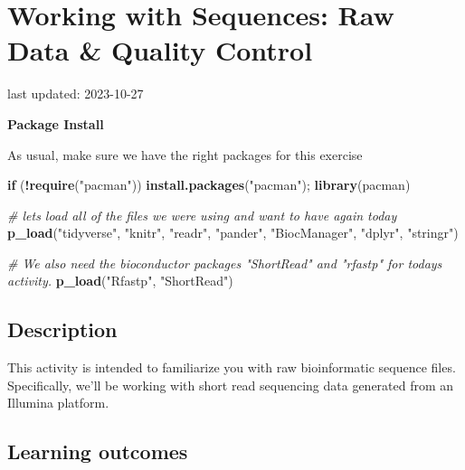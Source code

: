 \documentclass[
]{book}
\newenvironment{Shaded}{\begin{snugshade}}{\end{snugshade}}
\newcommand{\CommentTok}[1]{\textcolor[rgb]{0.56,0.35,0.01}{\textit{#1}}}
\newcommand{\ControlFlowTok}[1]{\textcolor[rgb]{0.13,0.29,0.53}{\textbf{#1}}}
\newcommand{\FunctionTok}[1]{\textcolor[rgb]{0.13,0.29,0.53}{\textbf{#1}}}
\newcommand{\NormalTok}[1]{#1}
\newcommand{\SpecialCharTok}[1]{\textcolor[rgb]{0.81,0.36,0.00}{\textbf{#1}}}
\newcommand{\StringTok}[1]{\textcolor[rgb]{0.31,0.60,0.02}{#1}}
\begin{document}
\hypertarget{working-with-sequences-raw-data-quality-control}{%
\chapter{Working with Sequences: Raw Data \& Quality Control}\label{working-with-sequences-raw-data-quality-control}}

last updated: 2023-10-27

\textbf{Package Install}

As usual, make sure we have the right packages for this exercise

\begin{Shaded}
\begin{Highlighting}[]
\ControlFlowTok{if}\NormalTok{ (}\SpecialCharTok{!}\FunctionTok{require}\NormalTok{(}\StringTok{"pacman"}\NormalTok{)) }\FunctionTok{install.packages}\NormalTok{(}\StringTok{"pacman"}\NormalTok{); }\FunctionTok{library}\NormalTok{(pacman)}

\CommentTok{\# let\textquotesingle{}s load all of the files we were using and want to have again today}
\FunctionTok{p\_load}\NormalTok{(}\StringTok{"tidyverse"}\NormalTok{, }\StringTok{"knitr"}\NormalTok{, }\StringTok{"readr"}\NormalTok{,}
       \StringTok{"pander"}\NormalTok{, }\StringTok{"BiocManager"}\NormalTok{, }
       \StringTok{"dplyr"}\NormalTok{, }\StringTok{"stringr"}\NormalTok{)}

\CommentTok{\# We also need the bioconductor packages "ShortRead" and "rfastp" for today\textquotesingle{}s activity.}
\FunctionTok{p\_load}\NormalTok{(}\StringTok{"Rfastp"}\NormalTok{, }\StringTok{"ShortRead"}\NormalTok{)}
\end{Highlighting}
\end{Shaded}

\hypertarget{description-1}{%
\section{Description}\label{description-1}}

This activity is intended to familiarize you with raw bioinformatic sequence files. Specifically, we'll be working with short read sequencing data generated from an Illumina platform.

\hypertarget{learning-outcomes-2}{%
\section{Learning outcomes}\label{learning-outcomes-2}}
\end{document}

